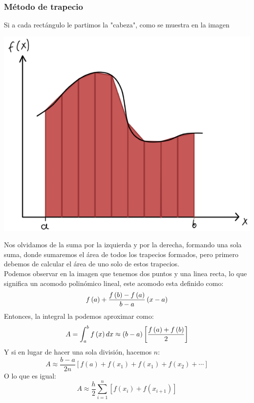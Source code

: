 \documentclass[10pt]{article}
\begin{document}
\begin{multicols}{2}
		\subsubsection{Método de trapecio}
		Si a cada rectángulo le partimos la "cabeza", como se muestra en la imagen\\
		\begin{center}
			\includegraphics[scale=0.2]{../Imagenes/2.png}
		\end{center}
		Nos olvidamos de la suma por la izquierda y por la derecha, formando una sola suma, donde sumaremos el área de todos los trapecios formados, pero primero debemos de calcular el área de uno solo de estos trapecios.\\
		Podemos observar en la imagen que tenemos dos puntos y una linea recta, lo que significa un acomodo polinómico lineal, este acomodo esta definido como:
		$$f\left( a \right) + {{f\left( b \right) - f\left( a \right)} \over {b - a}}\left( {x - a} \right)$$
		Entonces, la integral la podemos aproximar como:
		$$A = \int_a^b {f\left( x \right)dx} \approx \left( {b - a} \right)\left[ {{{f\left( a \right) + f\left( b \right)} \over 2}} \right]$$
		Y si en lugar de hacer una sola división, hacemos $n$:
		$$A \approx  \frac{b - a}{2n}\left[ {{{f\left( a \right) + f\left( x_1 \right)}}}+{{{f\left( x_1 \right) + f\left( x_2 \right)}}}+\cdots \right]$$
		O lo que es igual:
		$$A\approx\frac{h}{2}\sum_{i=1}^{n}\left[ f(x_i)+f(x_{i+1}) \right]$$
				

\end{multicols}
\end{document}
